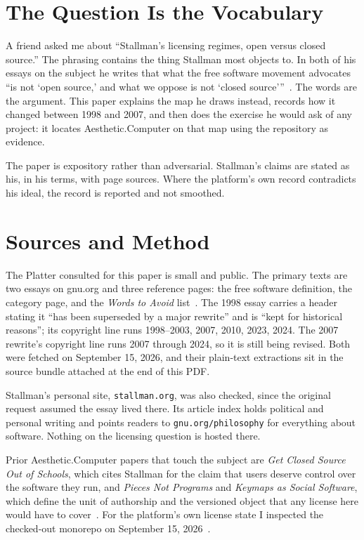 \documentclass[10pt,letterpaper,twocolumn]{article}
\newcommand{\acdot}{{\color{acpink}.}}
\newcommand{\ac}{Aesthetic{\acdot}Computer}
\newcommand{\code}[1]{\texttt{#1}}
\newcommand{\term}[1]{``#1''}
\begin{document}
\section{The Question Is the Vocabulary}

A friend asked me about \term{Stallman's licensing regimes, open versus closed source.} The phrasing contains the thing Stallman most objects to. In both of his essays on the subject he writes that what the free software movement advocates \term{is not `open source,' and what we oppose is not `closed source'}~\citep{stallman2007misses}. The words are the argument. This paper explains the map he draws instead, records how it changed between 1998 and 2007, and then does the exercise he would ask of any project: it locates \ac{} on that map using the repository as evidence.

The paper is expository rather than adversarial. Stallman's claims are stated as his, in his terms, with page sources. Where the platform's own record contradicts his ideal, the record is reported and not smoothed.

\section{Sources and Method}

The Platter consulted for this paper is small and public. The primary texts are two essays on gnu.org and three reference pages: the free software definition, the category page, and the \emph{Words to Avoid} list~\citep{stallman1998better,stallman2007misses,gnu_freesw,stallman_categories,gnu_words}. The 1998 essay carries a header stating it \term{has been superseded by a major rewrite} and is \term{kept for historical reasons}; its copyright line runs 1998--2003, 2007, 2010, 2023, 2024. The 2007 rewrite's copyright line runs 2007 through 2024, so it is still being revised. Both were fetched on September 15, 2026, and their plain-text extractions sit in the source bundle attached at the end of this PDF.

Stallman's personal site, \code{stallman.org}, was also checked, since the original request assumed the essay lived there. Its article index holds political and personal writing and points readers to \code{gnu.org/philosophy} for everything about software. Nothing on the licensing question is hosted there.

Prior \ac{} papers that touch the subject are \emph{Get Closed Source Out of Schools}, which cites Stallman for the claim that users deserve control over the software they run, and \emph{Pieces Not Programs} and \emph{Keymaps as Social Software}, which define the unit of authorship and the versioned object that any license here would have to cover~\citep{scudder2026openschools,scudder2026pieces,scudder2026keymaps}. For the platform's own license state I inspected the checked-out monorepo on September 15, 2026~\citep{acrepo2026}.
\end{document}
